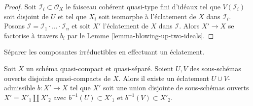 \begin{proof}
Soit  $\mathcal{I}_i \subset \mathcal{O}_X$  le faisceau cohérent quasi-type fini d'idéaux tel que
 $V(\mathcal{I}_i)$  soit disjoint de  $U$  et tel que  $X_i$  soit isomorphe
à l'éclatement de  $X$  dans  $\mathcal{I}_i$. Posons  $\mathcal{I} = \mathcal{I}_1 \cdot \ldots \cdot \mathcal{I}_n$  et soit
 $X'$  l'éclatement de  $X$  dans  $\mathcal{I}$. Alors  $X' \to X$  se
factorise à travers  $b_i$  par le Lemme  \ref{lemma-blowing-up-two-ideals}.
\end{proof}

\begin{lemma}
\label{lemma-separate-disjoint-opens-by-blowing-up}
\begin{slogan}
Séparer les composantes irréductibles en effectuant un éclatement.
\end{slogan}
Soit  $X$  un schéma quasi-compact et quasi-séparé. Soient  $U, V$  des
sous-schémas ouverts disjoints quasi-compacts de  $X$. Alors il existe un
éclatement  $U \cup V$-admissible  $b : X' \to X$  tel que  $X'$  soit une
union disjointe de sous-schémas ouverts  $X' = X'_1 \amalg X'_2$  avec  $b^{-1}(U) \subset X'_1$  et
 $b^{-1}(V) \subset X'_2$.
\end{lemma}

